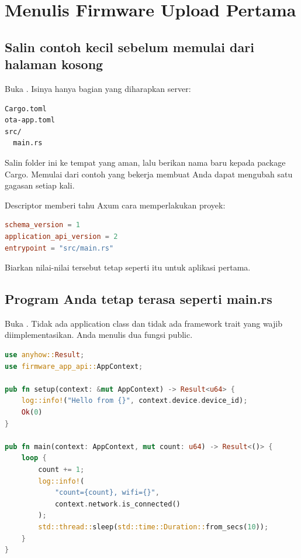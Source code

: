 \chapter{Menulis Firmware Upload Pertama}

\section{Salin contoh kecil sebelum memulai dari halaman kosong}

Buka . Isinya hanya bagian yang diharapkan server:

\begin{lstlisting}[numbers=none]
Cargo.toml
ota-app.toml
src/
  main.rs
\end{lstlisting}

Salin folder ini ke tempat yang aman, lalu berikan nama baru kepada package Cargo. Memulai dari contoh yang bekerja membuat Anda dapat mengubah satu gagasan setiap kali.

Descriptor memberi tahu Axum cara memperlakukan proyek:

\begin{lstlisting}[language=TOML,numbers=none]
schema_version = 1
application_api_version = 2
entrypoint = "src/main.rs"
\end{lstlisting}

Biarkan nilai-nilai tersebut tetap seperti itu untuk aplikasi pertama.

\section{Program Anda tetap terasa seperti main.rs}

Buka . Tidak ada application class dan tidak ada framework trait yang wajib diimplementasikan. Anda menulis dua fungsi public.

\begin{lstlisting}[language=Rust]
use anyhow::Result;
use firmware_app_api::AppContext;

pub fn setup(context: &mut AppContext) -> Result<u64> {
    log::info!("Hello from {}", context.device.device_id);
    Ok(0)
}

pub fn main(context: AppContext, mut count: u64) -> Result<()> {
    loop {
        count += 1;
        log::info!(
            "count={count}, wifi={}",
            context.network.is_connected()
        );
        std::thread::sleep(std::time::Duration::from_secs(10));
    }
}
\end{lstlisting}

